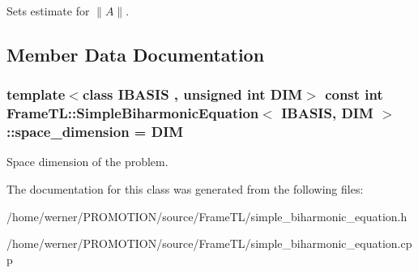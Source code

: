 Sets estimate for $\|A\|$. 

\subsection{Member Data Documentation}
\hypertarget{classFrameTL_1_1SimpleBiharmonicEquation_286b0e4560f9b71e48db27f7a1f80a37}{
\subsubsection[{space\_\-dimension}]{\setlength{\rightskip}{0pt plus 5cm}template$<$class IBASIS , unsigned int DIM$>$ const int {\bf FrameTL::SimpleBiharmonicEquation}$<$ IBASIS, DIM $>$::{\bf space\_\-dimension} = DIM}}
\label{classFrameTL_1_1SimpleBiharmonicEquation_286b0e4560f9b71e48db27f7a1f80a37}


Space dimension of the problem. 

The documentation for this class was generated from the following files:\begin{CompactItemize}
\item 
/home/werner/PROMOTION/source/FrameTL/simple\_\-biharmonic\_\-equation.h\item 
/home/werner/PROMOTION/source/FrameTL/simple\_\-biharmonic\_\-equation.cpp\end{CompactItemize}
